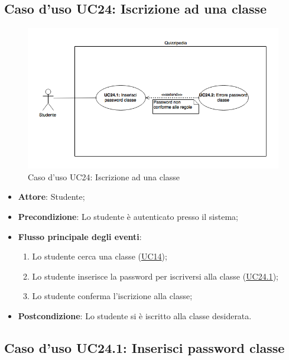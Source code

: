 \documentclass[12pt,a4paper]{article}
\begin{document}
\subsection{Caso d'uso UC24: Iscrizione ad una classe}
\begin{figure}[H]
	\centering
	\includegraphics[width=\textwidth]{../img/diagramUC24.png}
	\caption{Caso d'uso UC24: Iscrizione ad una classe}\label{fig:UC24} 
\end{figure}
\begin{itemize}

\item \textbf{Attore}: Studente; 
\item \textbf{Precondizione}: Lo studente è autenticato presso il sistema;

\item \textbf{Flusso principale degli eventi}:
\begin{enumerate}
	\item Lo studente cerca una classe (\hyperlink{UC14}{UC14});
	\item Lo studente inserisce la password per iscriversi alla classe (\hyperlink{UC24.1}{UC24.1});
	\item Lo studente conferma l'iscrizione alla classe;
	
\end{enumerate}
\item \textbf{Postcondizione}: Lo studente si è iscritto alla classe desiderata.
\end{itemize}
\hypertarget{UC24.1}{}
\subsection{Caso d'uso UC24.1: Inserisci password classe}
\end{document}
